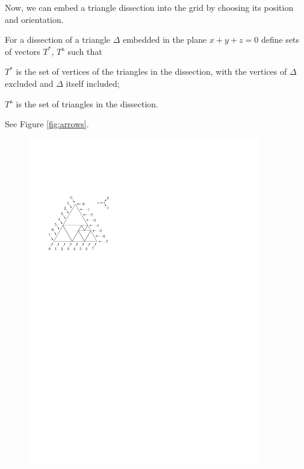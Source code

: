 Now, we can embed a triangle dissection into the grid by choosing its position and orientation.

\begin{defn}
For a dissection of a triangle $\Delta$ embedded in the plane $x+y+z=0$ define sets of vectors $T^*$, $T^\vartriangle$ such that
\begin{cosyitemize}
	\item $T^*$ is the set of vertices of the triangles in the dissection, with the vertices of $\Delta$ excluded and $\Delta$ itself included;
	\item $T^\vartriangle$ is the set of triangles in the dissection.
\end{cosyitemize}%
\end{defn}

\begin{exmp} See Figure \ref{fig:arrows}.
\begin{figure}[htb]
	\centering
	\begin{minipage}{.43\linewidth}
		\centering
		\includegraphics[width=0.9\textwidth]{img/arrows.pdf}

\end{minipage}
\end{figure}
\end{exmp}
